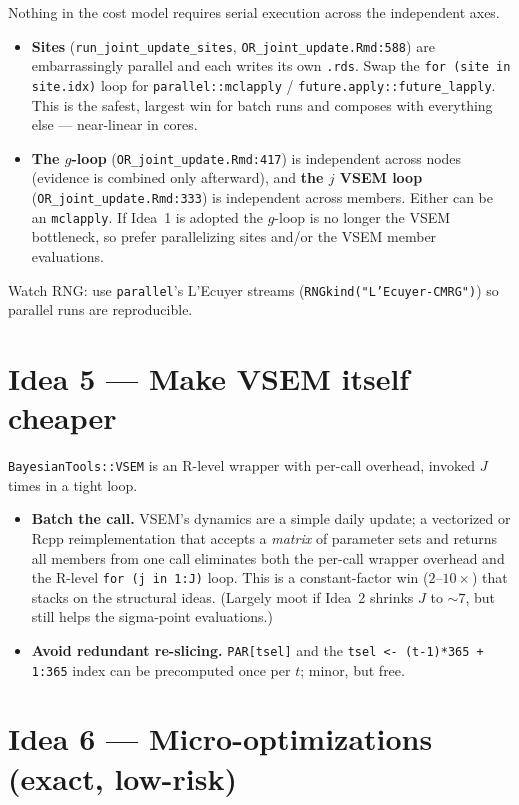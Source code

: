 \documentclass[11pt]{article}
\newcommand{\code}[1]{\texttt{#1}}
\begin{document}
Nothing in the cost model requires serial execution across the independent axes.
\begin{itemize}[nosep]
  \item \textbf{Sites} (\code{run\_joint\_update\_sites}, \code{OR\_joint\_update.Rmd:588})
        are embarrassingly parallel and each writes its own \code{.rds}. Swap the
        \code{for (site in site.idx)} loop for \code{parallel::mclapply} /
        \code{future.apply::future\_lapply}. This is the safest, largest win for batch
        runs and composes with everything else --- near-linear in cores.
  \item \textbf{The $g$-loop} (\code{OR\_joint\_update.Rmd:417}) is independent across
        nodes (evidence is combined only afterward), and \textbf{the $j$ VSEM loop}
        (\code{OR\_joint\_update.Rmd:333}) is independent across members. Either can be
        an \code{mclapply}. If Idea~1 is adopted the $g$-loop is no longer the VSEM
        bottleneck, so prefer parallelizing sites and/or the VSEM member evaluations.
\end{itemize}
Watch RNG: use \code{parallel}'s L'Ecuyer streams (\code{RNGkind("L'Ecuyer-CMRG")}) so
parallel runs are reproducible.

\section{Idea 5 --- Make VSEM itself cheaper}
\label{sec:vsem}

\code{BayesianTools::VSEM} is an R-level wrapper with per-call overhead, invoked $J$
times in a tight loop.
\begin{itemize}[nosep]
  \item \textbf{Batch the call.} VSEM's dynamics are a simple daily update; a vectorized
        or Rcpp reimplementation that accepts a \emph{matrix} of parameter sets and
        returns all members from one call eliminates both the per-call wrapper overhead
        and the R-level \code{for (j in 1:J)} loop. This is a constant-factor win
        ($2\text{--}10\times$) that stacks on the structural ideas. (Largely moot if
        Idea~2 shrinks $J$ to $\sim 7$, but still helps the sigma-point evaluations.)
  \item \textbf{Avoid redundant re-slicing.} \code{PAR[tsel]} and the
        \code{tsel <- (t-1)*365 + 1:365} index can be precomputed once per $t$; minor,
        but free.
\end{itemize}

\section{Idea 6 --- Micro-optimizations (exact, low-risk)}
\label{sec:micro}
\end{document}
